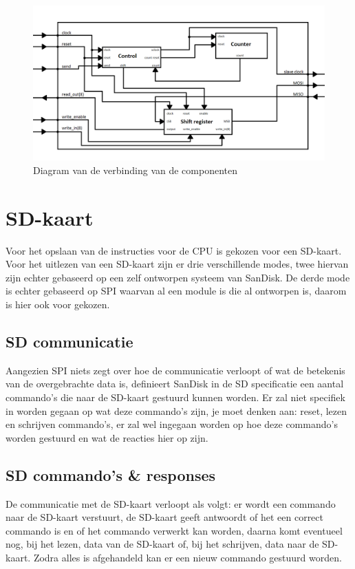 \documentclass[oneside,dutch]{tudelft-report}
\begin{document}
\begin{figure}[H]
\center
\includegraphics[width=11.4cm]{./spi_system_diagram}
\caption{Diagram van de verbinding van de componenten}
\label{spi-system-diagram}
\end{figure}

\newpage

\chapter{SD-kaart}
Voor het opslaan van de instructies voor de CPU is gekozen voor een SD-kaart. Voor het uitlezen van een SD-kaart zijn er drie verschillende modes, twee hiervan zijn echter gebaseerd op een zelf ontworpen systeem van SanDisk. De derde mode is echter gebaseerd op SPI waarvan al een module is die al ontworpen is, daarom is hier ook voor gekozen. 
\section{SD communicatie}
Aangezien SPI niets zegt over hoe de communicatie verloopt of wat de betekenis van de overgebrachte data is, definieert SanDisk in de SD specificatie een aantal commando’s die naar de SD-kaart gestuurd kunnen worden. Er zal niet specifiek in worden gegaan op wat deze commando’s zijn, je moet denken aan: reset, lezen en schrijven commando’s, er zal wel ingegaan worden op hoe deze commando’s worden gestuurd en wat de reacties hier op zijn.
\section{SD commando's \& responses}
De communicatie met de SD-kaart verloopt als volgt: er wordt een commando naar de SD-kaart verstuurt, de SD-kaart geeft antwoordt of het een correct commando is en of het commando verwerkt kan worden, daarna komt eventueel nog, bij het lezen, data van de SD-kaart of, bij het schrijven, data naar de SD-kaart. Zodra alles is afgehandeld kan er een nieuw commando gestuurd worden.
\end{document}
